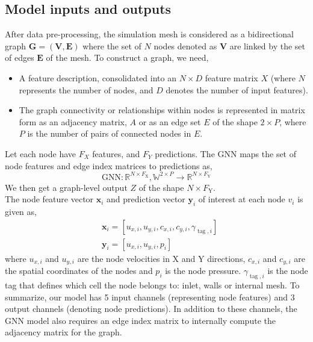 \subsection{Model inputs and outputs}
After data pre-processing, the simulation mesh is considered as a bidirectional graph $\mathbf{G} = (\mathbf{V}, \mathbf{E})$ where the set of $N$ nodes denoted as $\mathbf{V}$ are linked by the set of edges $\mathbf{E}$ of the mesh. To construct a graph, we need,
\begin{itemize}
\item A feature description, consolidated into an $N \times D$ feature matrix $X$ (where $N$ represents the number of nodes, and $D$ denotes the number of input features).
\item The graph connectivity or relationships within nodes is represented in matrix form as an adjacency matrix, $A$ or as an edge set $E$ of the shape $2 \times P$, where $P$ is the number of pairs of connected nodes in $E$.
\end{itemize}
Let each node have $F_X$ features, and $F_Y$ predictions. The GNN maps the set of node features and edge index matrices to predictions as, 
\begin{equation}
    \mathrm{GNN}: \mathbb{R}^{{N} \times F_{\mathrm{X}}}, \mathbb{W}^{2 \times P} \rightarrow \mathbb{R}^{{N} \times F_{\mathrm{Y}}}
    \end{equation}
We then get a graph-level output $Z$ of the shape ${N} \times F_{\mathrm{Y}}$. \\
The node feature vector $\mathbf{x}_i$ and prediction vector $\mathbf{y}_i$ of interest at each node $v_i$ is given as,
\begin{equation}
    \begin{aligned}
    & \mathbf{x}_i=\left[u_{x, i}, u_{y, i},c_{x, i}, c_{y, i}, \gamma_{\operatorname{tag}, i}\right] \\
    & \mathbf{y}_i=\left[u_{x, i}, u_{y, i}, p_i\right]
    \end{aligned}
\end{equation}
where $u_{x, i}$ and $u_{y, i}$ are the node velocities in X and Y directions, $c_{x, i}$ and $c_{y, i}$ are the spatial coordinates of the nodes and $p_i$ is the node pressure. $\gamma_{\operatorname{tag}, i}$ is the node tag that defines which cell the node belongs to: inlet, walls or internal mesh. To summarize, our model has 5 input channels (representing node features) and 3 output channels (denoting node predictions). In addition to these channels, the GNN model also requires an edge index matrix to internally compute the adjacency matrix for the graph. 
